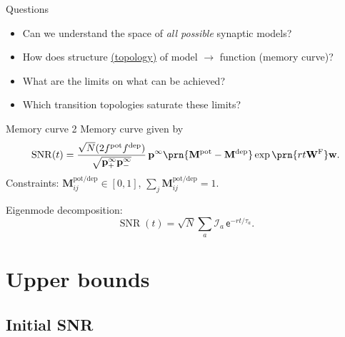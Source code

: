 \documentclass{beamer}%
\DeclareMathOperator{\snr}{SNR}
\newcommand{\pr}{\mathbf{p}}
\newcommand{\eq}{\pr^\infty}
\newcommand{\w}{\mathbf{w}}
\newcommand{\W}{\mathbf{W}}
\newcommand{\frg}{\W^\mathrm{F}}
\newcommand{\M}{\mathbf{M}}
\newcommand{\pot}{^{\text{pot}}}
\newcommand{\dep}{^{\text{dep}}}
\newcommand{\potdep}{^{\text{pot/dep}}}
\newcommand{\initial}{\mathcal{I}}
\renewcommand{\e}{\mathsf{e}}
\begin{document}

\begin{frame}[label=fr_questions]{Questions}
%
 \begin{itemize}
   \item Can we understand the space of \emph{all possible} synaptic models?
   \item How does structure \hyperlink{fr_net<1>}{(topology)} of model $\to$ function (memory curve)?
   \item What are the limits on what can be achieved?
   \item Which transition topologies saturate these limits?
 \end{itemize}
%
\end{frame}


\begin{frame}{Memory curve 2}
%
 Memory curve given by
 \begin{equation*}
   \snr(t) = \frac{\sqrt{N}(2f\pot f\dep)}{\sqrt{\eq_+\eq_-}}\, \eq \prn{\M\pot-\M\dep}
      \exp\prn{rt\frg}\w.
 \end{equation*}
 Constraints: \qquad $\M\potdep_{ij}\in[0,1]$, \qquad $\sum_j\M\potdep_{ij}=1$.
 
 \vp Eigenmode decomposition:
 \begin{equation*}
   \snr(t) = \sqrt{N}\sum_a \initial_a \,\e^{-rt/\tau_a}.
 \end{equation*}
%
\end{frame}



\section{Upper bounds}


\subsection{Initial SNR}
\end{document}
